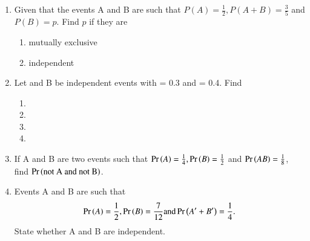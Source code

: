 \begin{enumerate}[label=\thesection.\arabic*,ref=\thesection.\theenumi]
\solution

\item Given that the events A and B are such that $P(A)=\frac{1}{2}, P(A + B)=\frac{3}{5}$ and $P(B)=p$. Find $p$ if they are 
\begin{enumerate}
\item mutually exclusive
\item independent
\end{enumerate}
\solution

\item Let  and B be independent events with  = 0.3 and  = 0.4. Find 
\begin{enumerate}
\item {} \item {}

\item {} \item {}
\end{enumerate}
\solution


\item  If A and B are two events such that $\Pr\left(A\right) = \frac{1}{4}, \Pr\left(B\right) = \frac{1}{2}$ and $\Pr\left(A B\right) = \frac{1}{8}$, find $\Pr\left(\text{not A and not B}\right)$.
	\\
\solution

\item Events A and B are such that 
\begin{align}
    \Pr\left(A\right)= \frac{1}{2},\Pr\left(B\right) = \frac{7}{12} \text{and} \Pr\left(A^{\prime}+B^{\prime}\right) = \frac{1}{4}.
\end{align}
State whether A and B are independent. 
	\\
\solution



\end{enumerate}
